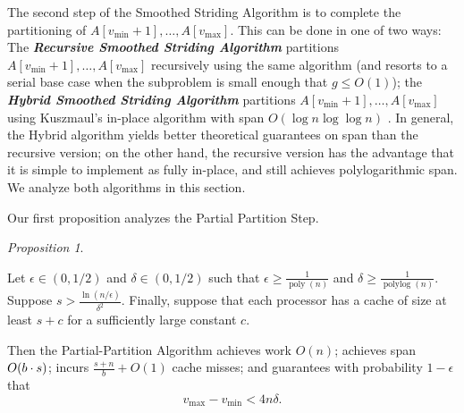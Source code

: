 \documentclass[11pt]{article}
\DeclarePairedDelimiter{\paren}{(}{)}
\newcommand{\poly}{\operatorname{poly}}
\newcommand{\polylog}{\operatorname{polylog}}
\newcommand{\defn}[1]{{\textit{\textbf{\boldmath #1}}}}
\renewcommand{\paragraph}[1]{\vspace{0.09in}\noindent{\bf \boldmath #1.}}
\theoremstyle{remark}
\newtheorem{proposition}[thm]{Proposition}
\theoremstyle{remark}
\begin{document}
The second step of the Smoothed Striding Algorithm is to complete the
partitioning of $A[v_{\text{min}} + 1], \ldots,
A[v_{\text{max}}]$. This can be done in one of two ways: The
\defn{Recursive Smoothed Striding Algorithm} partitions
$A[v_{\text{min}} + 1], \ldots, A[v_{\text{max}}]$ recursively using
the same algorithm (and resorts to a serial base case when the
subproblem is small enough that $g \le O(1)$); the \defn{Hybrid
  Smoothed Striding Algorithm} partitions $A[v_{\text{min}} + 1],
\ldots, A[v_{\text{max}}]$ using Kuszmaul's in-place algorithm with
span $O(\log n \log \log n)$ \cite{Kuszmaul19}. In general, the Hybrid
algorithm yields better theoretical guarantees on span than the
recursive version; on the other hand, the recursive version has the
advantage that it is simple to implement as fully in-place, and still
achieves polylogarithmic span. We analyze both algorithms in this
section.



\paragraph{Algorithm Analysis} Our first proposition analyzes the Partial Partition Step.
\begin{proposition}
  \label{prop:generalResult}
  
  Let $\epsilon \in (0, 1/2)$ and $\delta \in (0, 1/2)$ such that
  $\epsilon \ge \frac{1}{\poly(n)}$ and $\delta \ge
  \frac{1}{\polylog(n)}$. Suppose $s > \frac{\ln
    (n/\epsilon)}{\delta^2}$. Finally, suppose that each processor has
  a cache of size at least $s + c$ for a sufficiently large constant
  $c$.

  Then the Partial-Partition Algorithm achieves work $O(n)$; achieves
  span $O\paren*{b \cdot s}$; incurs $\frac{s+n}{b} + O(1)$ cache
  misses; and guarantees with probability $1 - \epsilon$ that
  $$v_{\text{max}}-v_{\text{min}} < 4 n \delta.$$
\end{proposition}
\end{document}
